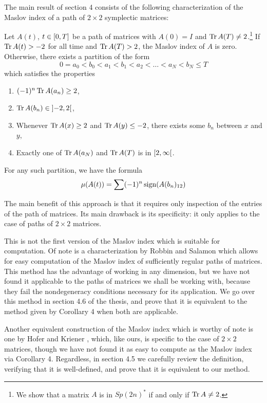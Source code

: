 The main result of section 4 consists of the following characterization of the Maslov index of a path of $2 \times 2$ symplectic matrices:
\begin{prop}[Corollary 4]
Let $A(t)$, $t \in \interval 0 T$ be a path of matrices with $A(0) = I$ and $\operatorname{Tr} A(T) \neq 2$.\footnote{We show that a matrix $A$ is in $Sp(2n)^*$ if and only if $\operatorname{Tr} A \neq 2$.} If $\operatorname{Tr} A(t) > -2$ for all time and $\operatorname{Tr} A(T) > 2$, the Maslov index of $A$ is zero. Otherwise, there exists a partition of the form
\begin{equation}
0 = a_0 < b_0 < a_1 < b_1 < a_2 < \dots < a_N < b_N \leq T
\end{equation}
which satisfies the properties
\begin{enumerate}
\item $(-1)^n \operatorname{Tr} A(a_n) \geq 2$,
\item $\trace A(b_n) \in \ointerval{-2}2$,
\item Whenever $\operatorname{Tr} A(x) \geq 2$ and $\operatorname{Tr} A(y) \leq -2$, there exists some $b_n$ between $x$ and $y$,
\item\label{calcmaslov:ab5} Exactly one of $\operatorname{Tr} A(a_N)$ and $\operatorname{Tr} A(T)$ is in $\rinterval 2 \infty$.
\end{enumerate}

For any such partition, we have the formula
\begin{equation}\label{calcmaslov:mu}
\mu(A(t)) = \sum (-1)^n \operatorname{sign}(A(b_n)_{12})
\end{equation}
\end{prop}

The main benefit of this approach is that it requires only inspection of the entries of the path of matrices. Its main drawback is its specificity: it only applies to the case of paths of $2 \times 2$ matrices.

This is not the first version of the Maslov index which is suitable for computation. Of note is a characterization by Robbin and Salamon \cite{robbin1993maslov} which allows for easy computation of the Maslov index of sufficiently regular paths of matrices. This method has the advantage of working in any dimension, but we have not found it applicable to the paths of matrices we shall be working with, because they fail the nondegeneracy conditions necessary for its application. We go over this method in section 4.6 of the thesis, and prove that it is equivalent to the method given by Corollary 4 when both are applicable.

Another equivalent construction of the Maslov index which is worthy of note is one by Hofer and Kriener \cite{hoferkriener}, which, like ours, is specific to the case of $2 \times 2$ matrices, though we have not found it as easy to compute as the Maslov index via Corollary 4. Regardless, in section 4.5 we carefully review the definition, verifying that it is well-defined, and prove that it is equivalent to our method.

